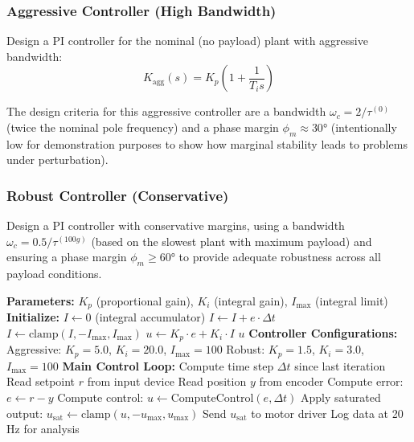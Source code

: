\subsubsection{Aggressive Controller (High Bandwidth)}

Design a PI controller for the nominal (no payload) plant with aggressive bandwidth:
\begin{equation}
K_{\text{agg}}(s) = K_p \left(1 + \frac{1}{T_i s}\right)
\end{equation}

The design criteria for this aggressive controller are a bandwidth $\omega_c = 2/\tau^{(0)}$ (twice the nominal pole frequency) and a phase margin $\phi_m \approx 30°$ (intentionally low for demonstration purposes to show how marginal stability leads to problems under perturbation).

\subsubsection{Robust Controller (Conservative)}

Design a PI controller with conservative margins, using a bandwidth $\omega_c = 0.5/\tau^{(100g)}$ (based on the slowest plant with maximum payload) and ensuring a phase margin $\phi_m \geq 60°$ to provide adequate robustness across all payload conditions.

\begin{algorithm}
\caption{PI Controller with Anti-Windup}
\label{alg:pi_control}
\begin{algorithmic}[1]
\State \textbf{Parameters:} $K_p$ (proportional gain), $K_i$ (integral gain), $I_{\max}$ (integral limit)
\State \textbf{Initialize:} $I \gets 0$ (integral accumulator)
\State
{}
    \State $I \gets I + e \cdot \Delta t$ 
    \State $I \gets \text{clamp}(I, -I_{\max}, I_{\max})$ 
    \State $u \gets K_p \cdot e + K_i \cdot I$ 
    \State \Return $u$
\EndProcedure
\State
\State \textbf{Controller Configurations:}
\State \quad Aggressive: $K_p = 5.0$, $K_i = 20.0$, $I_{\max} = 100$
\State \quad Robust: $K_p = 1.5$, $K_i = 3.0$, $I_{\max} = 100$
\State
\State \textbf{Main Control Loop:}
    \State Compute time step $\Delta t$ since last iteration
    \State Read setpoint $r$ from input device
    \State Read position $y$ from encoder
    \State Compute error: $e \gets r - y$
    \State Compute control: $u \gets \text{ComputeControl}(e, \Delta t)$
    \State Apply saturated output: $u_{\text{sat}} \gets \text{clamp}(u, -u_{\max}, u_{\max})$
    \State Send $u_{\text{sat}}$ to motor driver
    \State Log data at 20 Hz for analysis
\EndWhile
\end{algorithmic}
\end{algorithm}


